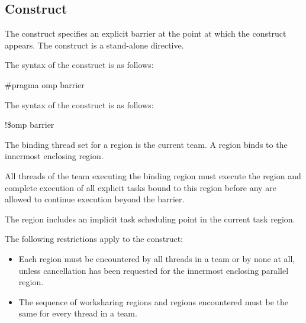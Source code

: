 \subsection{ Construct}
\label{subsec:barrier Construct}
\summary
The  construct specifies an explicit barrier at the point at which the construct 
appears. The  construct is a stand-alone directive.

\syntax
\ccppspecificstart
The syntax of the  construct is as follows:

\begin{boxedcode}
\#pragma omp barrier 
\end{boxedcode}
\ccppspecificend

\fortranspecificstart
The syntax of the  construct is as follows:

\begin{boxedcode}
!\$omp barrier
\end{boxedcode}
\fortranspecificend

\binding
The binding thread set for a  region is the current team. A  region 
binds to the innermost enclosing  region. 

\descr
All threads of the team executing the binding  region must execute the 
 region and complete execution of all explicit tasks bound to this  
region before any are allowed to continue execution beyond the barrier.

The  region includes an implicit task scheduling point in the current task 
region.

\restrictions
The following restrictions apply to the  construct:

\begin{itemize}
\item Each  region must be encountered by all threads in a team or by none at all, 
unless cancellation has been requested for the innermost enclosing parallel region.

\item The sequence of worksharing regions and  regions encountered must be the 
same for every thread in a team.
\end{itemize}









